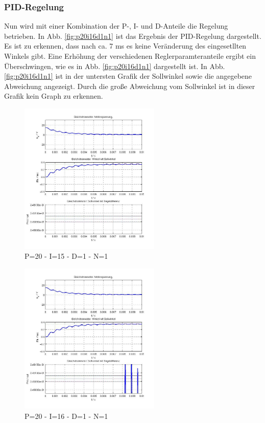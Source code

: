 \subsubsection{PID-Regelung}
\label{chap:pid_regelung}
Nun wird mit einer Kombination der P-, I- und D-Anteile die Regelung betrieben.
In Abb. \ref{fig:p20i16d1n1} ist das Ergebnis der PID-Regelung dargestellt. 
Es ist zu erkennen, dass nach ca. 7 ms es keine Veränderung des eingesetllten Winkels gibt. 
Eine Erhöhung der verschiedenen Reglerparamteranteile ergibt ein Überschwingen, wie es in Abb. \ref{fig:p20i16d1n1} dargestellt ist.
In Abb. \ref{fig:p20i16d1n1} ist in der untersten Grafik der Sollwinkel sowie die angegebene Abweichung angezeigt.
Durch die große Abweichung vom Sollwinkel ist in dieser Grafik kein Graph zu erkennen.
\begin{figure}[!h]
	\centering
	\includegraphics[width=0.6\textwidth]{PID-P20I15D1N1.jpg}
	\caption{P=20 - I=15 - D=1 - N=1}
	\label{fig:p20i15d1n1}
\end{figure}
\begin{figure}[!h]
	\centering
	\includegraphics[width=0.6\textwidth]{PID-P20I16D1N1.jpg}
	\caption{P=20 - I=16 - D=1 - N=1}
	\label{fig:p2oi16d1n1}
\end{figure}

